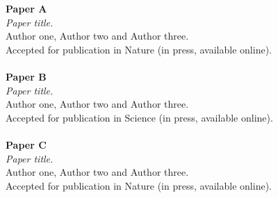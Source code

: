 \documentclass[twoside,openright,11pt]{book}
\begin{document}
\pagestyle{plain}

 
\newpage

 
\clearpage %

\cleardoublepage

\cleardoublepage %


\cleardoublepage %


\cleardoublepage %

\tableofcontents

 
\noindent 
\textbf{Paper A} \\
\textsl{Paper title.} \\
Author one, Author two and Author three.\\
Accepted for publication in Nature (in press, available online). \\ \\
\textbf{Paper B} \\
\textsl{Paper title.} \\
Author one, Author two and Author three.\\
Accepted for publication in Science (in press, available online). \\ \\
\textbf{Paper C} \\
\textsl{Paper title.} \\
Author one, Author two and Author three.\\
Accepted for publication in Nature (in press, available online). \\ \\
\end{document}
